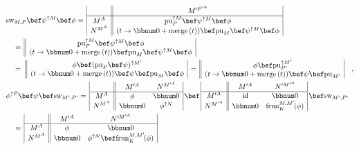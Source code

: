 \begin{align*}
 & \text{sw}_{M,P}\bef\psi^{\uparrow M}\bef\phi=\,\begin{array}{|c||c|}
 & M^{\prime P^{\prime A}}\\
\hline M^{A} & \text{pu}_{P}^{\uparrow M}\bef\psi^{\uparrow M}\bef\phi\\
N^{M^{A}} & (t\rightarrow\bbnum 0+\text{merge}\,(t))\bef\text{pu}_{M}\bef\psi^{\uparrow M}\bef\phi
\end{array}\\
 & \quad=\,\begin{array}{||c|}
\text{pu}_{P}^{\uparrow M}\bef\psi^{\uparrow M}\bef\phi\\
(t\rightarrow\bbnum 0+\text{merge}\,(t))\bef\text{pu}_{M}\bef\psi^{\uparrow M}\bef\phi
\end{array}\\
 & \quad=\,\,\begin{array}{||c|}
\phi\bef(\text{pu}_{P}\bef\psi)^{\uparrow M^{\prime}}\\
(t\rightarrow\bbnum 0+\text{merge}\,(t))\bef\psi\bef\text{pu}_{M}\bef\phi
\end{array}\,=\,\begin{array}{||c|}
\phi\bef\text{pu}_{P^{\prime}}^{\uparrow M^{\prime}}\\
(t\rightarrow\bbnum 0+\text{merge}\,(t))\bef\psi\bef\text{pu}_{M^{\prime}}
\end{array}\quad,\\
 & \phi^{\uparrow P}\bef\psi\bef\text{sw}_{M^{\prime},P^{\prime}}=\,\begin{array}{|c||cc|}
 & M^{\prime A} & N^{M^{\prime A}}\\
\hline M^{A} & \phi & \bbnum 0\\
N^{M^{A}} & \bbnum 0 & \phi^{\uparrow N}
\end{array}\,\bef\,\begin{array}{|c||cc|}
 & M^{\prime A} & N^{\prime M^{\prime A}}\\
\hline M^{\prime A} & \text{id} & \bbnum 0\\
N^{M^{\prime A}} & \bbnum 0 & \text{frun}_{K}^{M,M^{\prime}}\!(\phi)
\end{array}\,\bef\text{sw}_{M^{\prime},P^{\prime}}\\
 & \quad=\,\begin{array}{|c||cc|}
 & M^{\prime A} & N^{\prime M^{\prime A}}\\
\hline M^{A} & \phi & \bbnum 0\\
N^{M^{A}} & \bbnum 0 & \phi^{\uparrow N}\bef\text{frun}_{K}^{M,M^{\prime}}\!(\phi)

\end{array}
\end{align*}

